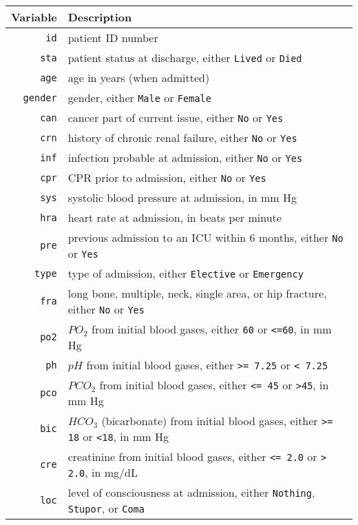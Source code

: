 \documentclass[
]{article}
\begin{document}
\begin{center}
\begin{tabular}{r|l}
\textbf{Variable} & \textbf{Description} \\
\hline
\texttt{id} & patient ID number \\
\texttt{sta} & patient status at discharge, either \texttt{Lived} or \texttt{Died} \\
\texttt{age} & age in years (when admitted) \\
\texttt{gender} & gender, either \texttt{Male} or \texttt{Female} \\
\texttt{can} & cancer part of current issue, either \texttt{No} or \texttt{Yes} \\
\texttt{crn} & history of chronic renal failure, either \texttt{No} or \texttt{Yes}\\
\texttt{inf} & infection probable at admission, either \texttt{No} or \texttt{Yes} \\
\texttt{cpr} & CPR prior to admission, either \texttt{No} or \texttt{Yes} \\
\texttt{sys} & systolic blood pressure at admission, in mm Hg \\
\texttt{hra} & heart rate at admission, in beats per minute \\
\texttt{pre} & previous admission to an ICU within 6 months, either \texttt{No} or \texttt{Yes} \\
\texttt{type} & type of admission, either \texttt{Elective} or \texttt{Emergency} \\
\texttt{fra} & long bone, multiple, neck, single area, or hip fracture, either \texttt{No} or \texttt{Yes} \\
\texttt{po2} & $PO_2$ from initial blood gases, either \texttt{60} or \texttt{<=60}, in mm Hg\\
\texttt{ph} & $pH$ from initial blood gases, either \texttt{>= 7.25} or \texttt{< 7.25} \\
\texttt{pco} & $PCO_2$ from initial blood gases, either \texttt{<= 45} or \texttt{>45}, in mm Hg \\
\texttt{bic} & $HCO_3$ (bicarbonate) from initial blood gases, either \texttt{>= 18} or \texttt{<18}, in mm Hg \\
\texttt{cre} & creatinine from initial blood gases, either \texttt{<= 2.0} or \texttt{> 2.0}, in mg/dL \\
\texttt{loc} & level of consciousness at admission, either \texttt{Nothing}, \texttt{Stupor}, or \texttt{Coma}
\end{tabular}
\end{center}
\end{document}
